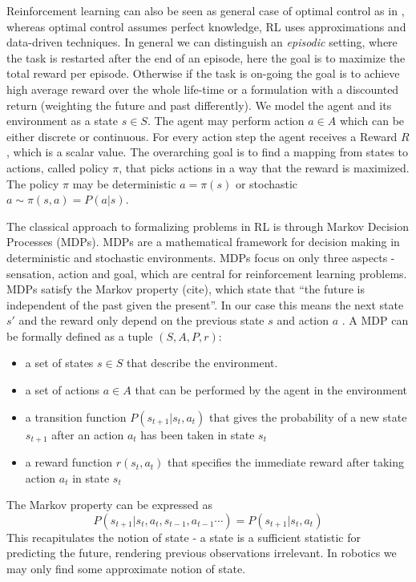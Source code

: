Reinforcement learning can also be seen as
general case of optimal control as in \citet{sutton1992reinforcement},
whereas optimal control assumes perfect knowledge, RL uses approximations
and data-driven techniques.
In general we can distinguish an \textit{episodic} setting,
where the task is restarted after
the end of an episode, here the goal is
to maximize the total reward per episode.
Otherwise if the task is on-going the goal
is to achieve high average reward over
the whole life-time or a formulation with a discounted return (weighting the
future and past differently).
We model the agent and its environment as a state $s \in S$. The agent
may perform action $ a \in A$ which can be either discrete or continuous.
For every action step the agent receives a Reward $R$, which is a scalar value.
The overarching goal is to find a mapping from states to actions,
called policy $\pi$, that picks actions in a way that
the reward is maximized.
The policy $\pi$ may
be deterministic $a = \pi(s)$ or stochastic $a \sim \pi(s,a) = P(a | s)$.

The classical approach to formalizing problems in RL is through
Markov Decision Processes (MDPs).
MDPs are a mathematical
framework for decision making in deterministic and stochastic environments.
MDPs focus on only three aspects
- sensation, action and goal, which are central
for reinforcement learning problems.
MDPs satisfy the Markov property (cite), which state that ``the future is independent
of the past given the present''. In our case this means the next state $s'$ and the reward
only depend on the previous state $s$ and action $a$ \citet{sutton1992reinforcement}.
A MDP can be formally defined as a tuple $(S, A, P, r)$:

\begin{itemize}
\item a set of states $s \in S$ that describe the environment.
\item a set of actions $a \in A$ that can be performed by the agent in the environment
\item a transition function $P(s_{t+1} | s_t, a_t)$ that gives the probability of a new
  state $s_{t+1}$ after an action $a_t$ has been taken in state $s_t$
\item a reward function $r(s_t, a_t)$ that specifies the immediate reward after taking action
  $a_t$ in state $s_t$
\end{itemize}

The Markov property can be expressed as
$$ P(s_{t+1} | s_t, a_t, s_{t-1}, a_{t-1}\cdots) = P(s_{t+1} | s_t, a_t)$$
This recapitulates the notion of state - a state is a sufficient statistic
for predicting the future, rendering previous observations irrelevant.
In robotics we may only find some approximate notion of state.

